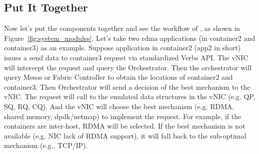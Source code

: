 \subsection{Put It Together}
Now let's put the components together and see the workflow of \sysname, as shown in Figure~\ref{fig:system_modules}.
Let's take two rdma applications (in container2 and container3) as an example.
Suppose application in container2 (app2 in short) issues a send data to container3 request via standardized Verbs API.
The vNIC will intercept the request and query the Orchestrator. 
Then the orchestrator will query Mesos or Fabric Controller to obtain the locations of 
container2 and container3. Then Orchestrator will send a decision of the best mechanism to the vNIC.
The request will call to the emulated data structures in the vNIC (e.g. QP, SQ, RQ, CQ). And the vNIC will choose the
best mechanism (e.g. RDMA, shared memory, dpdk/netmap) to implement the request. For example, if the containers
are inter-host, RDMA will be selected. If the best mechanism is not available (e.g. NIC lack of RDMA support), it will
fall back to the sub-optimal mechanism (e.g., TCP/IP).

\fi
